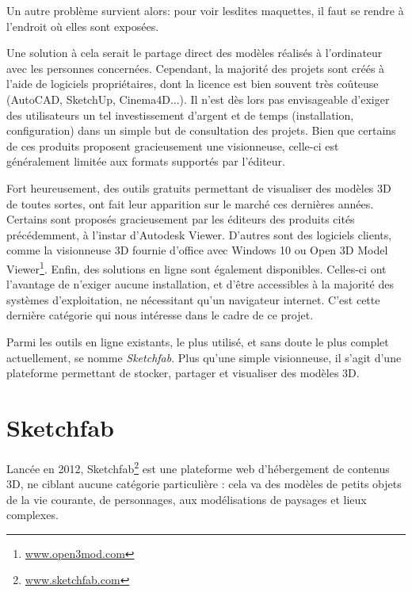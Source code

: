Un autre problème survient alors: pour voir lesdites maquettes, il faut se rendre à l'endroit où elles sont exposées.

Une solution à cela serait le partage direct des modèles réalisés à l'ordinateur avec les personnes concernées. Cependant, la majorité des projets sont créés à l'aide de logiciels propriétaires, dont la licence est bien souvent très coûteuse (AutoCAD, SketchUp, Cinema4D...). Il n'est dès lors pas envisageable d'exiger des utilisateurs un tel investissement d'argent et de temps (installation, configuration) dans un simple but de consultation des projets.
Bien que certains de ces produits proposent gracieusement une visionneuse, celle-ci est généralement limitée aux formats supportés par l'éditeur.

Fort heureusement, des outils gratuits permettant de visualiser des modèles 3D de toutes sortes, ont fait leur apparition sur le marché ces dernières années. Certains sont proposés gracieusement par les éditeurs des produits cités précédemment, à l'instar d'Autodesk Viewer. D'autres sont des logiciels clients, comme la visionneuse 3D fournie d'office avec Windows 10 ou Open 3D Model Viewer\footnote{\url{www.open3mod.com}}. Enfin, des solutions en ligne sont également disponibles. Celles-ci ont l'avantage de n'exiger aucune installation, et d'être accessibles à la majorité des systèmes d'exploitation, ne nécessitant qu'un navigateur internet.
C'est cette dernière catégorie qui nous intéresse dans le cadre de ce projet.

Parmi les outils en ligne existants, le plus utilisé, et sans doute le plus complet actuellement, se nomme \textit{Sketchfab}. Plus qu'une simple visionneuse, il s'agit d'une plateforme permettant de stocker, partager et visualiser des modèles 3D. 

\section{Sketchfab} \label{sketchfab}

Lancée en 2012, Sketchfab\footnote{\url{www.sketchfab.com}} est une plateforme web d'hébergement de contenus 3D, ne ciblant aucune catégorie particulière : cela va des modèles de petits objets de la vie courante, de personnages, aux modélisations de paysages et lieux complexes.

